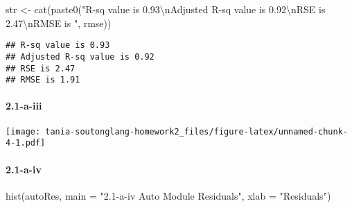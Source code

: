 \documentclass[
]{article}
\newenvironment{Shaded}{\begin{snugshade}}{\end{snugshade}}
\newcommand{\AttributeTok}[1]{\textcolor[rgb]{0.77,0.63,0.00}{#1}}
\newcommand{\FunctionTok}[1]{\textcolor[rgb]{0.00,0.00,0.00}{#1}}
\newcommand{\NormalTok}[1]{#1}
\newcommand{\OtherTok}[1]{\textcolor[rgb]{0.56,0.35,0.01}{#1}}
\newcommand{\SpecialCharTok}[1]{\textcolor[rgb]{0.00,0.00,0.00}{#1}}
\newcommand{\StringTok}[1]{\textcolor[rgb]{0.31,0.60,0.02}{#1}}
\begin{document}
\begin{Shaded}
\begin{Highlighting}[]
\NormalTok{str }\OtherTok{\textless{}{-}} \FunctionTok{cat}\NormalTok{(}\FunctionTok{paste0}\NormalTok{(}\StringTok{"R{-}sq value is 0.93}\SpecialCharTok{\textbackslash{}n}\StringTok{Adjusted R{-}sq value is 0.92}\SpecialCharTok{\textbackslash{}n}\StringTok{RSE is 2.47}\SpecialCharTok{\textbackslash{}n}\StringTok{RMSE is "}\NormalTok{, rmse))}
\end{Highlighting}
\end{Shaded}

\begin{verbatim}
## R-sq value is 0.93
## Adjusted R-sq value is 0.92
## RSE is 2.47
## RMSE is 1.91
\end{verbatim}

\hypertarget{a-iii}{%
\paragraph{2.1-a-iii}\label{a-iii}}

\begin{Shaded}
\end{Shaded}

\texttt{[image: tania-soutonglang-homework2\_files/figure-latex/unnamed-chunk-4-1.pdf]}

\hypertarget{a-iv}{%
\paragraph{2.1-a-iv}\label{a-iv}}

\begin{Shaded}
\begin{Highlighting}[]
\FunctionTok{hist}\NormalTok{(autoRes, }\AttributeTok{main =} \StringTok{"2.1{-}a{-}iv Auto Module Residuals"}\NormalTok{, }\AttributeTok{xlab =} \StringTok{"Residuals"}\NormalTok{)}
\end{Highlighting}
\end{Shaded}
\end{document}
